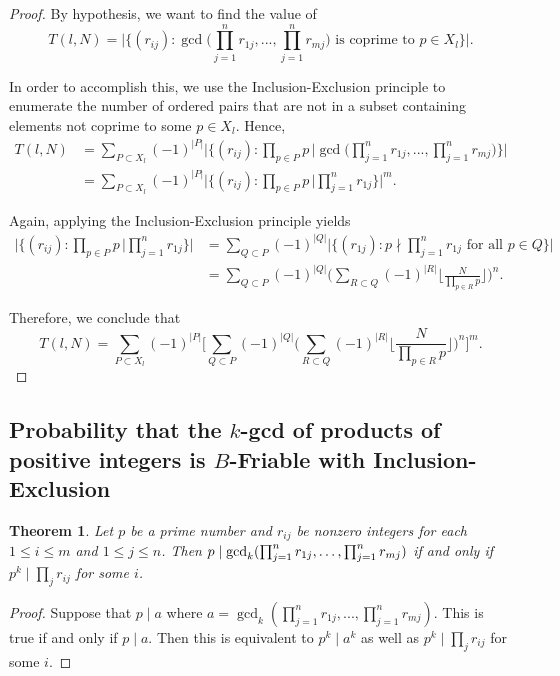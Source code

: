 \documentclass[12pt]{amsart}
\newtheorem{theorem}{Theorem}[subsection]
\theoremstyle{definition}
\begin{document}
\begin{proof}
By hypothesis, we want to find the value of
$$T(l,N) = \Big|\Big\{(r_{ij}) : \gcd\Big(\prod_{j=1}^nr_{1j}, ..., \prod_{j=1}^{n} r_{mj}\Big) \text{ is coprime to } p\in X_l \Big\}\Big|.$$
	
In order to accomplish this, we use the Inclusion-Exclusion principle to enumerate the number of ordered pairs that are not in a subset containing elements not coprime to some $p\in X_l$. Hence, 
	\begin{align*}
		T(l, N) &= \sum_{P\subset X_l}{(-1)^{|P|}}\Bigg|\Big\{(r_{ij}):\prod_{p\in P} p \, \Big| \gcd\Big(\prod_{j=1}^nr_{1j}, ... ,\prod_{j=1}^{n} r_{mj}\Big) \Big\} \Bigg|\\ &= \sum_{P\subset X_l}{(-1)^{|P|}} \Bigg|\Big\{(r_{ij}):\prod_{p\in P} p \, \Big| \prod_{j=1}^nr_{1j}\Big\}\Bigg|^m.
	\end{align*}
	
	\noindent Again, applying the Inclusion-Exclusion principle yields
	\begin{align*}
		\Bigg|\Big\{(r_{ij}):\prod_{p\in P} p \, \Big|\prod_{j=1}^nr_{1j}\Big\}\Bigg| &=\sum_{Q\subset P}(-1)^{|Q|}\Big|\Big\{(r_{1j}): p \nmid \prod_{j=1}^nr_{1j} \text{ for all } p\in Q \Big\}\Big|\\
		&=\sum_{Q\subset P}(-1)^{|Q|}\Biggl(\sum_{R\subset Q}(-1)^{|R|}\Biggl\lfloor\frac{N}{\prod_{p\in R} p}\Biggr\rfloor\Biggr)^n.
	\end{align*}
	
	\noindent Therefore, we conclude that
	$$T(l,N)=\sum_{P\subset X_l}{(-1)^{|P|}}\Bigg[\sum_{Q\subset P}(-1)^{|Q|}\Big(\sum_{R\subset Q}(-1)^{|R|}\Big\lfloor\frac{N}{\prod_{p\in R} p}\Big\rfloor\Big)^n\Bigg]^m.$$
\end{proof}

\subsection{Probability that the $k$-gcd of products of positive integers is $B$-Friable with Inclusion-Exclusion}

\begin{theorem} Let $p$ be a prime number and $r_{ij}$ be nonzero integers for each $1 \leq i \leq m$ and $1 \leq j \leq n$. Then
	$p \mid \gcd_k(\prod_{j=1}^{n}r_{1j},\mathellipsis,\prod_{j=1}^n r_{mj})$ if and only if $p^k \mid \prod_{j}r_{ij}$ for some $i$.
\end{theorem}

\begin{proof}
	Suppose that $p \mid a$ where $a = \gcd_k(\prod_{j=1}^n r_{1j}, ...,\prod_{j=1}^n r_{mj})$. This is true if and only if $p \mid a$. Then this is equivalent to $p^k \mid a^k$ as well as $p^k \mid \prod_j r_{ij}$ for some $i$.
\end{proof}
\end{document}

